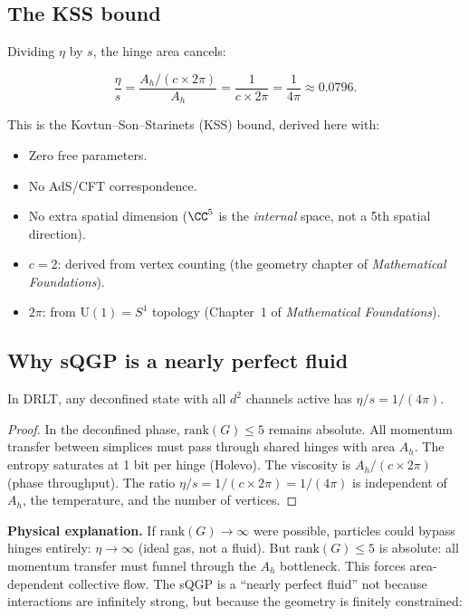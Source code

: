 \subsection{The KSS bound}

Dividing $\eta$ by $s$, the hinge area cancels:

\begin{equation}
\boxed{\frac{\eta}{s} = \frac{A_h/(c \times 2\pi)}{A_h} = \frac{1}{c \times 2\pi} = \frac{1}{4\pi} \approx 0.0796.}
\end{equation}

This is the Kovtun--Son--Starinets (KSS) bound, derived here with:
\begin{itemize}
\item Zero free parameters.
\item No AdS/CFT correspondence.
\item No extra spatial dimension ($\CC^5$ is the \emph{internal} space, not a 5th spatial direction).
\item $c = 2$: derived from vertex counting (the geometry chapter of \textit{Mathematical Foundations}).
\item $2\pi$: from $\text{U}(1) = S^1$ topology (Chapter~1 of \textit{Mathematical Foundations}).
\end{itemize}

\subsection{Why sQGP is a nearly perfect fluid}

\begin{theorem}
In DRLT, any deconfined state with all $d^2$ channels active has $\eta/s = 1/(4\pi)$.
\end{theorem}

\begin{proof}
In the deconfined phase, $\text{rank}(G) \leq 5$ remains absolute. All momentum transfer between simplices must pass through shared hinges with area $A_h$. The entropy saturates at 1 bit per hinge (Holevo). The viscosity is $A_h/(c \times 2\pi)$ (phase throughput). The ratio $\eta/s = 1/(c \times 2\pi) = 1/(4\pi)$ is independent of $A_h$, the temperature, and the number of vertices.
\end{proof}

\textbf{Physical explanation.} If $\text{rank}(G) \to \infty$ were possible, particles could bypass hinges entirely: $\eta \to \infty$ (ideal gas, not a fluid). But $\text{rank}(G) \leq 5$ is absolute: all momentum transfer must funnel through the $A_h$ bottleneck. This forces area-dependent collective flow. The sQGP is a ``nearly perfect fluid'' not because interactions are infinitely strong, but because the geometry is finitely constrained:

